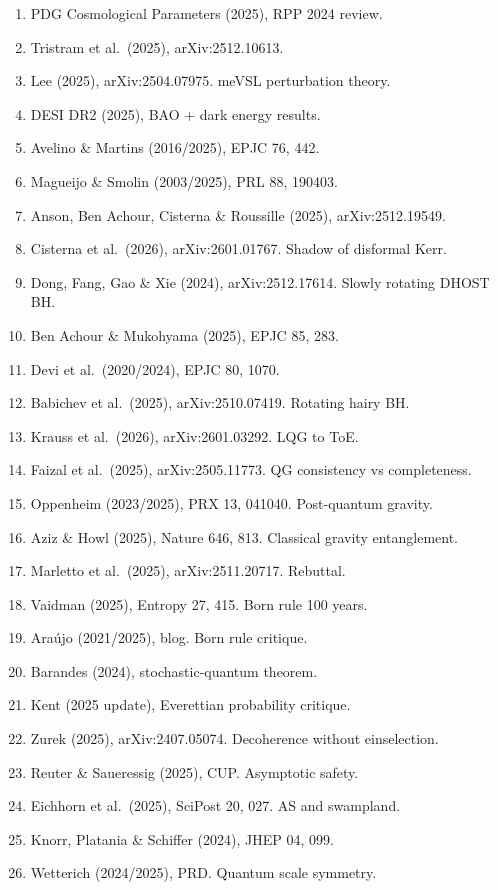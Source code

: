 \documentclass[11pt,a4paper]{article}
\begin{document}
\begin{enumerate}
\item PDG Cosmological Parameters (2025), RPP 2024 review.
\item Tristram et al.\ (2025), arXiv:2512.10613.
\item Lee (2025), arXiv:2504.07975. meVSL perturbation theory.
\item DESI DR2 (2025), BAO + dark energy results.
\item Avelino \& Martins (2016/2025), EPJC 76, 442.
\item Magueijo \& Smolin (2003/2025), PRL 88, 190403.
\item Anson, Ben Achour, Cisterna \& Roussille (2025), arXiv:2512.19549.
\item Cisterna et al.\ (2026), arXiv:2601.01767. Shadow of disformal Kerr.
\item Dong, Fang, Gao \& Xie (2024), arXiv:2512.17614. Slowly rotating DHOST BH.
\item Ben Achour \& Mukohyama (2025), EPJC 85, 283.
\item Devi et al.\ (2020/2024), EPJC 80, 1070.
\item Babichev et al.\ (2025), arXiv:2510.07419. Rotating hairy BH.
\item Krauss et al.\ (2026), arXiv:2601.03292. LQG to ToE.
\item Faizal et al.\ (2025), arXiv:2505.11773. QG consistency vs completeness.
\item Oppenheim (2023/2025), PRX 13, 041040. Post-quantum gravity.
\item Aziz \& Howl (2025), Nature 646, 813. Classical gravity entanglement.
\item Marletto et al.\ (2025), arXiv:2511.20717. Rebuttal.
\item Vaidman (2025), Entropy 27, 415. Born rule 100 years.
\item Ara\'ujo (2021/2025), blog. Born rule critique.
\item Barandes (2024), stochastic-quantum theorem.
\item Kent (2025 update), Everettian probability critique.
\item Zurek (2025), arXiv:2407.05074. Decoherence without einselection.
\item Reuter \& Saueressig (2025), CUP. Asymptotic safety.
\item Eichhorn et al.\ (2025), SciPost 20, 027. AS and swampland.
\item Knorr, Platania \& Schiffer (2024), JHEP 04, 099.
\item Wetterich (2024/2025), PRD. Quantum scale symmetry.

\end{enumerate}
\end{document}
